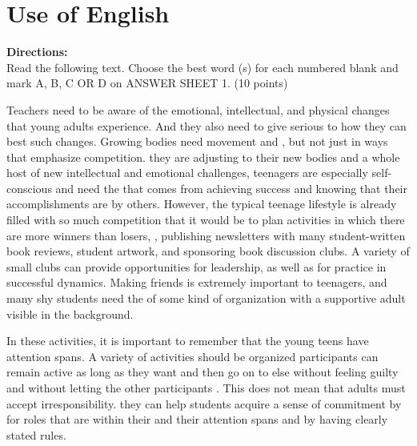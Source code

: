 

\section{Use of English}

\noindent
\textbf{Directions:}\\
Read the following text. Choose the best word (s) for each
	numbered blank and mark A, B, C OR D on ANSWER SHEET 1. (10 points)

\TiGanSpace


Teachers need to be aware of the emotional, intellectual, and physical
changes that young adults experience. And they also need to give serious
\cloze to how they can best \cloze such changes. Growing
bodies need movement and \cloze , but not just in ways that
emphasize competition. \cloze they are adjusting to their new
bodies and a whole host of new intellectual and emotional challenges,
teenagers are especially self-conscious and need the \cloze that
comes from achieving success and knowing that their accomplishments are
\cloze by others. However, the typical teenage lifestyle is
already filled with so much competition that it would be \cloze
to plan activities in which there are more winners than losers,
\cloze , publishing newsletters with many student-written book
reviews, \cloze student artwork, and sponsoring book discussion
clubs. A variety of small clubs can provide \cloze opportunities
for leadership, as well as for practice in successful \cloze
dynamics. Making friends is extremely important to teenagers, and many
shy students need the \cloze of some kind of organization with a
supportive adult \cloze visible in the background.

In these activities, it is important to remember that the young teens
have \cloze attention spans. A variety of activities should be
organized \cloze participants can remain active as long as they
want and then go on to \cloze else without feeling guilty and
without letting the other participants \cloze. This does not
mean that adults must accept irresponsibility. \cloze they can
help students acquire a sense of commitment by \cloze for roles
that are within their \cloze and their attention spans and by
having clearly stated rules.


\newpage

